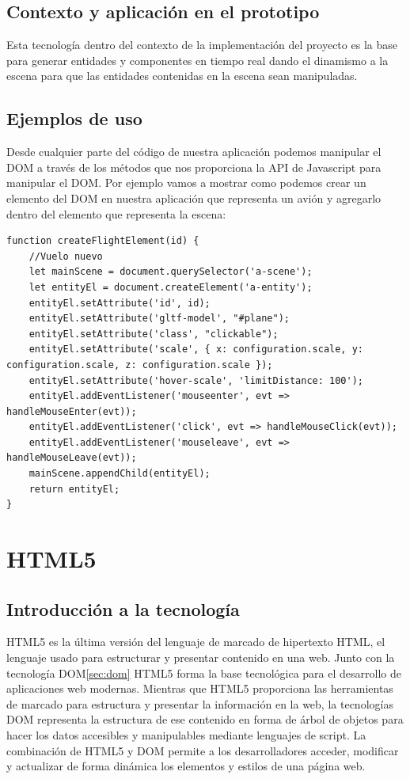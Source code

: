 \documentclass[a4paper, 11pt]{book}
\begin{document}
\subsection{Contexto y aplicación en el prototipo}
Esta tecnología dentro del contexto de la implementación del proyecto es la base para generar entidades y componentes en tiempo real dando el dinamismo a la escena para que las entidades contenidas en la escena sean manipuladas.
\subsection{Ejemplos de uso}
Desde cualquier parte del código de nuestra aplicación podemos manipular el DOM a través de los métodos que nos proporciona la API de Javascript para manipular el DOM. Por ejemplo vamos a mostrar como podemos crear un elemento del DOM en nuestra aplicación que representa un avión y agregarlo dentro del elemento que representa la escena:
\begin{verbatim}
function createFlightElement(id) {
    //Vuelo nuevo
    let mainScene = document.querySelector('a-scene');
    let entityEl = document.createElement('a-entity');
    entityEl.setAttribute('id', id);
    entityEl.setAttribute('gltf-model', "#plane");
    entityEl.setAttribute('class', "clickable");
    entityEl.setAttribute('scale', { x: configuration.scale, y: configuration.scale, z: configuration.scale });
    entityEl.setAttribute('hover-scale', 'limitDistance: 100');
    entityEl.addEventListener('mouseenter', evt => handleMouseEnter(evt));
    entityEl.addEventListener('click', evt => handleMouseClick(evt));
    entityEl.addEventListener('mouseleave', evt => handleMouseLeave(evt));
    mainScene.appendChild(entityEl);
    return entityEl;
}
\end{verbatim}


\section{HTML5}
\label{sec:html5}
\subsection{Introducción a la tecnología}
HTML5 es la última versión del lenguaje de marcado de hipertexto HTML, el lenguaje usado para estructurar y presentar contenido en una web. Junto con la tecnología DOM\ref{sec:dom} HTML5 forma la base tecnológica para el desarrollo de aplicaciones web modernas. Mientras que HTML5 proporciona las herramientas de marcado para estructura y presentar la información en la web, la tecnologías DOM representa la estructura de ese contenido en forma de árbol de objetos para hacer los datos accesibles y manipulables mediante lenguajes de script.
La combinación de HTML5 y DOM permite a los desarrolladores acceder, modificar y actualizar de forma dinámica los elementos y estilos de una página web.
\end{document}
